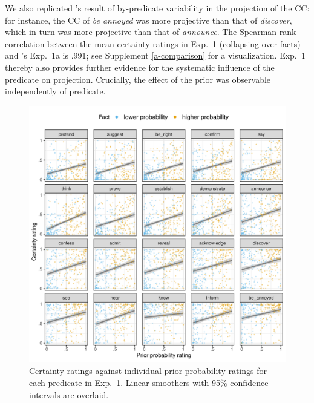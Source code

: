 \documentclass[11pt,fleqn]{article}
\newcommand{\6}{\mbox{$[\hspace*{-.6mm}[$}}
\newcommand{\9}{\mbox{$]\hspace*{-.6mm}]$}}
\newcommand{\citepos}[1]{\citeauthor{#1}'s \citeyear{#1}}
\newcommand{\citetpos}[1]{\citeauthor{#1}'s \citeyear{#1}}
\begin{document}
We also replicated \citetpos{tonhauser-degen-factive} result of by-predicate variability in the projection of the CC: for instance, the CC of {\em be annoyed} was more projective than that of {\em discover}, which in turn was more projective than that of {\em announce}. The Spearman rank correlation between the mean certainty ratings in Exp.~1 (collapsing over facts) and \citepos{tonhauser-degen-factive} Exp.~1a is .991; see Supplement \ref{a-comparison} for a visualization. Exp.~1 thereby also provides further evidence for the systematic influence of the predicate on projection. Crucially, the effect of the prior was observable independently of predicate.

\begin{figure}[h!]
\centering

\includegraphics[width=.7\paperwidth]{../../results/9-prior-projection/graphs/projection-by-prior}

\caption{Certainty ratings against individual prior probability ratings for each predicate in Exp.~1. Linear smoothers with 95\% confidence intervals are overlaid.}
\label{f-projection}
\end{figure}
\end{document}
